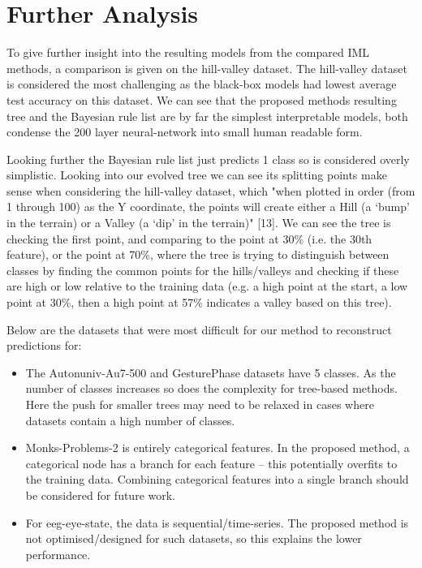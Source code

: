 \section{Further Analysis}
To give further insight into the resulting models from the compared IML methods, a comparison is given on the hill-valley dataset. The hill-valley dataset is considered the most challenging as the black-box models had lowest average test accuracy on this dataset. We can see that the proposed method\textquotesingle s resulting tree and the Bayesian rule list are by far the simplest interpretable models, both condense the 200 layer neural-network into small human readable form.

Looking further the Bayesian rule list just predicts 1 class so is considered overly simplistic. Looking into our evolved tree we can see its splitting points make sense when considering the hill-valley dataset, which "when plotted in order (from 1 through 100) as the Y coordinate, the points will create either a Hill (a `bump' in the terrain) or a Valley (a `dip' in the terrain)" [13]. We can see the tree is checking the first point, and comparing to the point at 30\% (i.e. the 30th feature), or the point at 70\%, where the tree is trying to distinguish between classes by finding the common points for the hills/valleys and checking if these are high or low relative to the training data (e.g. a high point at the start, a low point at 30\%, then a high point at 57\% indicates a valley based on this tree).

Below are the datasets that were most difficult for our method to reconstruct predictions for:
\begin{itemize}
\item The Autonuniv-Au7-500 and GesturePhase datasets have 5 classes. As the number of classes increases so does the complexity for tree-based methods. Here the push for smaller trees may need to be relaxed in cases where datasets contain a high number of classes.
\item Monks-Problems-2 is entirely categorical features. In the proposed method, a categorical node has a branch for each feature -- this potentially overfits to the training data. Combining categorical features into a single branch should be considered for future work.
\item For eeg-eye-state, the data is sequential/time-series. The proposed method is not optimised/designed for such datasets, so this explains the lower performance.
\end{itemize}
